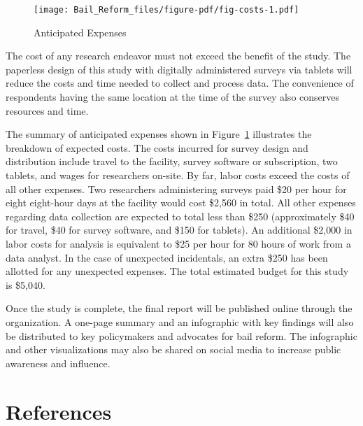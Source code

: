 \documentclass[
  letterpaper,
  DIV=11,
  numbers=noendperiod]{scrartcl}
\begin{document}
\begin{figure}

\caption{\label{fig-costs}Anticipated Expenses}

{\centering \texttt{[image: Bail\_Reform\_files/figure-pdf/fig-costs-1.pdf]}

}

\end{figure}

The cost of any research endeavor must not exceed the benefit of the
study. The paperless design of this study with digitally administered
surveys via tablets will reduce the costs and time needed to collect and
process data. The convenience of respondents having the same location at
the time of the survey also conserves resources and time.

The summary of anticipated expenses shown in Figure~\ref{fig-costs}
illustrates the breakdown of expected costs. The costs incurred for
survey design and distribution include travel to the facility, survey
software or subscription, two tablets, and wages for researchers
on-site. By far, labor costs exceed the costs of all other expenses. Two
researchers administering surveys paid \$20 per hour for eight
eight-hour days at the facility would cost \$2,560 in total. All other
expenses regarding data collection are expected to total less than \$250
(approximately \$40 for travel, \$40 for survey software, and \$150 for
tablets). An additional \$2,000 in labor costs for analysis is
equivalent to \$25 per hour for 80 hours of work from a data analyst. In
the case of unexpected incidentals, an extra \$250 has been allotted for
any unexpected expenses. The total estimated budget for this study is
\$5,040.

Once the study is complete, the final report will be published online
through the organization. A one-page summary and an infographic with key
findings will also be distributed to key policymakers and advocates for
bail reform. The infographic and other visualizations may also be shared
on social media to increase public awareness and influence.

\newpage

\hypertarget{references}{%
\section*{References}\label{references}}
\end{document}
